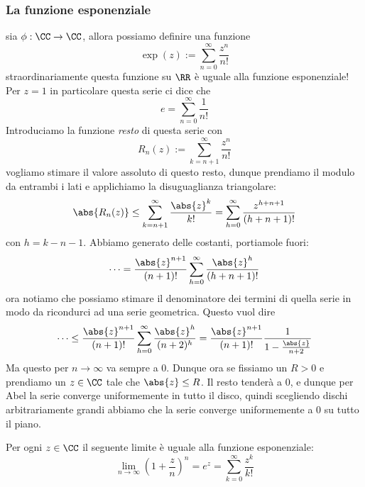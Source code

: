 \documentclass[11pt]{scrartcl}
\begin{document}
	 \subsubsection{La funzione esponenziale}
	 sia $\phi:\CC\to\CC$, allora possiamo definire una funzione
	 $$\exp(z):=\sum_{n=0}^{\infty}\frac{z^n}{n!}$$
	 straordinariamente questa funzione su $\RR$ è uguale alla funzione esponenziale! Per $z=1$ in particolare questa serie ci dice che
	 $$e=\sum_{n=0}^{\infty}\frac{1}{n!}$$
	 Introduciamo la funzione \textit{resto} di questa serie con 
	 $$R_n(z):=\sum_{k=n+1}^{\infty}\frac{z^n}{n!}$$
	 vogliamo stimare il valore assoluto di questo resto, dunque prendiamo il modulo da entrambi i lati e applichiamo la disuguaglianza triangolare:
	 $$\abs{R_n(z)}\le\sum_{k=n+1}^{\infty}\frac{\abs{z}^k}{k!}=\sum_{h=0}^{\infty}\frac{z^{h+n+1}}{(h+n+1)!}$$
	 con $h=k-n-1$. Abbiamo generato delle costanti, portiamole fuori:
	 $$\dots = \frac{\abs{z}^{n+1}}{(n+1)!}\sum_{h=0}^{\infty}\frac{\abs{z}^h}{(h+n+1)!}$$
	 ora notiamo che possiamo stimare il denominatore dei termini di quella serie in modo da ricondurci ad una serie geometrica. Questo vuol dire
	 $$\dots\le\frac{\abs{z}^{n+1}}{(n+1)!}\sum_{h=0}^{\infty}\frac{\abs{z}^h}{(n+2)^h}=\frac{\abs{z}^{n+1}}{(n+1)!}\frac{1}{1-\frac{\abs{z}}{n+2}} $$
	 Ma questo per $n\to\infty$ va sempre a $0$. Dunque ora se fissiamo un $R>0$ e prendiamo un $z\in\CC$ tale che $\abs{z}\le R$. Il resto tenderà a $0$, e dunque per Abel la serie converge uniformemente in tutto il disco, quindi scegliendo dischi arbitrariamente grandi abbiamo che la serie converge uniformemente a $0$ su tutto il piano. \\
	 \begin{theorem}
	 	Per ogni $z\in\CC$ il seguente limite è uguale alla funzione esponenziale:
	 	$$\lim_{n\to\infty}\left(1+\frac{z}{n}\right)^n=e^z=\sum_{k=0}^{\infty}\frac{z^k}{k!}$$
	 \end{theorem}
\end{document}
